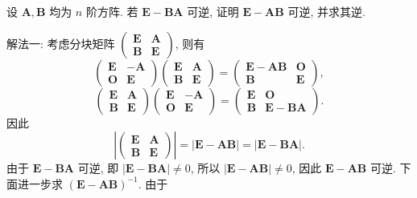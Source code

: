 \documentclass[../../main.tex]{subfiles}
\begin{document}
\begin{example}\label{example:例:3.15.矩阵逆例题1}
设 \(\boldsymbol{A}, \boldsymbol{B}\) 均为 \(n\) 阶方阵. 若 \(\boldsymbol{E} - \boldsymbol{BA}\) 可逆, 证明 \(\boldsymbol{E} - \boldsymbol{AB}\) 可逆, 并求其逆.
\end{example}
\begin{solution}
{\color{blue}解法一:}
考虑分块矩阵 \(\begin{pmatrix} \boldsymbol{E} & \boldsymbol{A} \\ \boldsymbol{B} & \boldsymbol{E} \end{pmatrix}\), 则有
\[
\begin{pmatrix} \boldsymbol{E} & -\boldsymbol{A} \\ \boldsymbol{O} & \boldsymbol{E} \end{pmatrix} \begin{pmatrix} \boldsymbol{E} & \boldsymbol{A} \\ \boldsymbol{B} & \boldsymbol{E} \end{pmatrix} = \begin{pmatrix} \boldsymbol{E} - \boldsymbol{AB} & \boldsymbol{O} \\ \boldsymbol{B} & \boldsymbol{E} \end{pmatrix},
\]
\[
\begin{pmatrix} \boldsymbol{E} & \boldsymbol{A} \\ \boldsymbol{B} & \boldsymbol{E} \end{pmatrix} \begin{pmatrix} \boldsymbol{E} & -\boldsymbol{A} \\ \boldsymbol{O} & \boldsymbol{E} \end{pmatrix} = \begin{pmatrix} \boldsymbol{E} & \boldsymbol{O} \\ \boldsymbol{B} & \boldsymbol{E} - \boldsymbol{BA} \end{pmatrix}.
\]
因此
\[
\left| \begin{pmatrix} \boldsymbol{E} & \boldsymbol{A} \\ \boldsymbol{B} & \boldsymbol{E} \end{pmatrix} \right| = |\boldsymbol{E} - \boldsymbol{AB}| = |\boldsymbol{E} - \boldsymbol{BA}|.
\]
由于 \(\boldsymbol{E} - \boldsymbol{BA}\) 可逆, 即 \(|\boldsymbol{E} - \boldsymbol{BA}| \neq 0\), 所以 \(|\boldsymbol{E} - \boldsymbol{AB}| \neq 0\), 因此 \(\boldsymbol{E} - \boldsymbol{AB}\) 可逆. 下面进一步求 \((\boldsymbol{E} - \boldsymbol{AB})^{-1}\). 由于
\[
\begin{aligned}

\end{aligned}\]
\end{solution}
\end{document}
